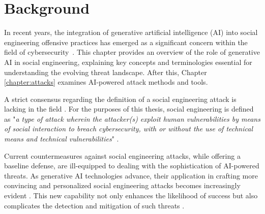 

    

\chapter{Background\label{chapter:definition}}
\begin{comment}

Guides:
    - Page limit 1-2 pages
    - Context and terminology (käsitteet), challenges and measurement criteria, values, research question analysis
    - Tarkentaa tavoiteet ja osakysymykset, vertailukriteerit (jotka jäsentävät muita lukuja)

TODO:
    [ ] 

What to cover:
    - What is cybersecurity and why it's of paramount importance
    - What is social engineering
        - Brief history of social engineering
            - Phishing in 1996 via AOL
    - Attacks, classical social engineering attacks
        - Phishing, vishing, smishing
    - Countermeasures, classical
        - User awareness & training programs
        - Company policy & company culture
    - Typical challenges

\end{comment}

In recent years, the integration of generative artificial intelligence (AI) into social engineering offensive practices has emerged as a significant concern within the field of cybersecurity~\citep{blauth_AI_Crime_Overview_Malicious_Use_Abuse_2022, fakhouriAIDrivenSolutionsForSocialEngineeringAttacks2024}. This chapter provides an overview of the role of generative AI in social engineering, explaining key concepts and terminologies essential for understanding the evolving threat landscape. After this, Chapter \ref{chapter:attacks}  examines AI-powered attack methods and tools.

A strict consensus regarding the definition of a social engineering attack is lacking in the field  \citep{hatfieldSocialEngineeringCybersecurity2018a}. For the purposes of this thesis, social engineering is defined as "\textit{a type of attack wherein the attacker(s) exploit human vulnerabilities by means of social interaction to breach cybersecurity, with or without the use of technical means and technical vulnerabilities}" \citep{wangDefiningSocialEngineering2020}.

Current countermeasures against social engineering attacks, while offering a baseline defense, are ill-equipped to dealing with the sophistication of AI-powered threats. As generative AI technologies advance, their application in crafting more convincing and personalized social engineering attacks becomes increasingly evident \citep{blauth_AI_Crime_Overview_Malicious_Use_Abuse_2022}. This new capability not only enhances the likelihood of success but also complicates the detection and mitigation of such threats \citep{basitComprehensiveSurveyAIenabledPhishingAttacks2021}.

